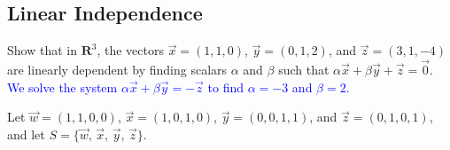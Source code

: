 \documentclass[a4paper,11pt]{article}
\newcommand{\R}{\mathbf{R}}
\newcommand{\BB}[1]{\textcolor{blue}{#1}}
\begin{document}
\subsection*{Linear Independence}

 Show that in $\R^3$, the vectors $\vec
x=(1,1,0)$, $\vec y=(0,1,2)$, and $\vec z=(3,1,-4)$ are linearly dependent by
finding scalars $\alpha$ and $\beta$ such that $\alpha\vec x+\beta\vec y+\vec
z=\vec 0$. \\

\BB{We solve the system $\alpha\vec x+\beta\vec y=-\vec z$ to find $\alpha=-3$
  and $\beta=2$. \\}

 Let $\vec w=(1,1,0,0)$, $\vec x=(1,0,1,0)$, $\vec
y=(0,0,1,1)$, and $\vec z=(0,1,0,1)$, and let $S=\{\vec w,\,\vec x,\,\vec
y,\,\vec z\}$.
\end{document}
